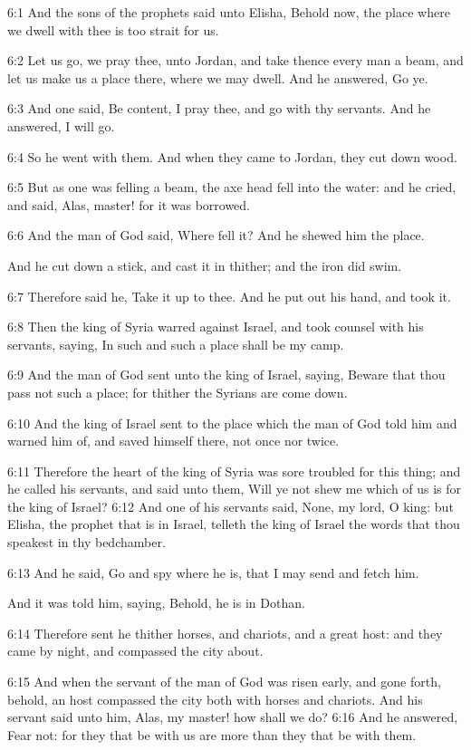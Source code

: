 6:1 And the sons of the prophets said unto Elisha, Behold now, the place where we dwell with thee is too strait for us.

6:2 Let us go, we pray thee, unto Jordan, and take thence every man a beam, and let us make us a place there, where we may dwell. And he answered, Go ye.

6:3 And one said, Be content, I pray thee, and go with thy servants.  And he answered, I will go.

6:4 So he went with them. And when they came to Jordan, they cut down wood.

6:5 But as one was felling a beam, the axe head fell into the water: and he cried, and said, Alas, master! for it was borrowed.

6:6 And the man of God said, Where fell it? And he shewed him the place.

And he cut down a stick, and cast it in thither; and the iron did swim.

6:7 Therefore said he, Take it up to thee. And he put out his hand, and took it.

6:8 Then the king of Syria warred against Israel, and took counsel with his servants, saying, In such and such a place shall be my camp.

6:9 And the man of God sent unto the king of Israel, saying, Beware that thou pass not such a place; for thither the Syrians are come down.

6:10 And the king of Israel sent to the place which the man of God told him and warned him of, and saved himself there, not once nor twice.

6:11 Therefore the heart of the king of Syria was sore troubled for this thing; and he called his servants, and said unto them, Will ye not shew me which of us is for the king of Israel?  6:12 And one of his servants said, None, my lord, O king: but Elisha, the prophet that is in Israel, telleth the king of Israel the words that thou speakest in thy bedchamber.

6:13 And he said, Go and spy where he is, that I may send and fetch him.

And it was told him, saying, Behold, he is in Dothan.

6:14 Therefore sent he thither horses, and chariots, and a great host: and they came by night, and compassed the city about.

6:15 And when the servant of the man of God was risen early, and gone forth, behold, an host compassed the city both with horses and chariots. And his servant said unto him, Alas, my master! how shall we do?  6:16 And he answered, Fear not: for they that be with us are more than they that be with them.

